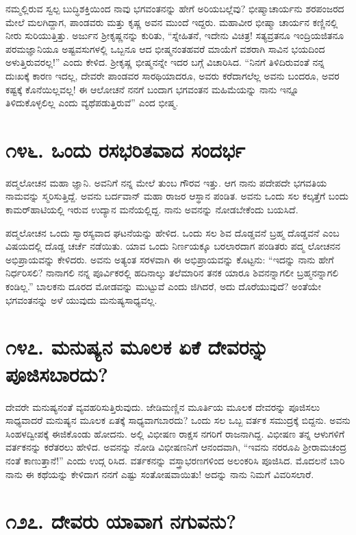ನಮ್ಮಲ್ಲಿರುವ ಸ್ವಲ್ಪ ಬುದ್ಧಿಶಕ್ತಿಯಿಂದ ನಾವು ಭಗವಂತನನ್ನು ಹೇಗೆ ಅರಿಯಬಲ್ಲೆವು? ಭೀಷ್ಮಾಚಾರ್ಯನು ಶರಪಂಜರದ ಮೇಲೆ ಮಲಗಿದ್ದಾಗ, ಪಾಂಡವರು ಮತ್ತು ಕೃಷ್ಣ ಅವನ ಮುಂದೆ ಇದ್ದರು. ಮಹಾವೀರ ಭೀಷ್ಮಾ ಚಾರ್ಯನ ಕಣ್ಣಿನಲ್ಲಿ ನೀರು ಸುರಿಯುತ್ತಿತ್ತು. ಅರ್ಜುನ ಶ್ರೀಕೃಷ್ಣನನ್ನು ಕುರಿತು, “ಸ್ನೇಹಿತನೆ, ಇದೇನು ವಿಚಿತ್ರ! ಸತ್ಯವ್ರತನೂ ಇಂದ್ರಿಯಜಿತನೂ ಪರಮಜ್ಞಾನಿಯೂ ಅಷ್ಟವಸುಗಳಲ್ಲಿ ಒಬ್ಬನೂ ಆದ ಭೀಷ್ಮನಂತಹವರೆ ಮಾಯೆಗೆ ವಶರಾಗಿ ಸಾವಿನ ಭಯದಿಂದ ಅಳುತ್ತಿರುವರಲ್ಲ!” ಎಂದು ಕೇಳಿದ. ಶ್ರೀಕೃಷ್ಣ ಭೀಷ್ಮನನ್ನೇ ಇದರ ಬಗ್ಗೆ ವಿಚಾರಿಸಿದ. “ನಿನಗೆ ತಿಳಿದಿರುವಂತೆ ನನ್ನ ದುಃಖಕ್ಕೆ ಕಾರಣ ಇದಲ್ಲ, ದೇವರೇ ಪಾಂಡವರ ಸಾರಥಿಯಾದರೂ, ಅವರು ಕರೆದಾಗಲೆಲ್ಲ ಅವನು ಬಂದರೂ, ಅವರ ಕಷ್ಟಕ್ಕೆ ಕೊನೆಯಿಲ್ಲವಲ್ಲ! ಈ ಆಲೋಚನೆ ನನಗೆ ಬಂದಾಗ ಭಗವಂತನ ಮಹಿಮೆಯನ್ನು ನಾನು ಇನ್ನೂ ತಿಳಿದುಕೊಳ್ಳಲಿಲ್ಲ ಎಂದು ವ್ಯಥೆಪಡುತ್ತಿರುವೆ” ಎಂದ ಭೀಷ್ಮ.


\section{\num{೧೪೬. } ಒಂದು ರಸಭರಿತವಾದ ಸಂದರ್ಭ}

ಪದ್ಮಲೋಚನ ಮಹಾ ಜ್ಞಾನಿ. ಅವನಿಗೆ ನನ್ನ ಮೇಲೆ ತುಂಬ ಗೌರವ ಇತ್ತು. ಆಗ ನಾನು ಪದೇಪದೇ ಭಗವತಿಯ ನಾಮವನ್ನು ಸ್ಮರಿಸುತ್ತಿದ್ದೆ. ಅವನು ಬರ್ದವಾನ್ ಮಹಾ ರಾಜರ ಆಸ್ಥಾನ ಪಂಡಿತ. ಅವನು ಒಂದು ಸಲ ಕಲ್ಕತ್ತೆಗೆ ಬಂದು ಕಾಮರ್​ಹಾಟಿಯಲ್ಲಿ ಇರುವ ಉದ್ಯಾನ ಮನೆಯಲ್ಲಿದ್ದ. ನಾನು ಅವನನ್ನು ನೋಡಬೇಕೆಂದು ಬಯಸಿದೆ.

ಪದ್ಮಲೋಚನ ಒಂದು ಸ್ವಾರಸ್ಯವಾದ ಘಟನೆಯನ್ನು ಹೇಳಿದ. ಒಂದು ಸಲ ಶಿವ ದೊಡ್ಡವನೆ ಬ್ರಹ್ಮ ದೊಡ್ಡವನೆ ಎಂಬ ವಿಷಯದಲ್ಲಿ ದೊಡ್ಡ ಚರ್ಚೆ ನಡೆಯಿತು. ಯಾವ ಒಂದು ನಿರ್ಣಯಕ್ಕೂ ಬರಲಾರದಾಗ ಪಂಡಿತರು ಪದ್ಮ ಲೋಚನನ ಅಭಿಪ್ರಾಯವನ್ನು ಕೇಳಿದರು. ಅವನು ಅತ್ಯಂತ ಸರಳವಾಗಿ ಈ ಅಭಿಪ್ರಾಯವನ್ನು ಕೊಟ್ಟನು: “ಇದನ್ನು ನಾನು ಹೇಗೆ ನಿರ್ಧರಿಸಲಿ? ನಾನಾಗಲಿ ನನ್ನ ಪೂರ್ವಿಕರಲ್ಲಿ ಹದಿನಾಲ್ಕು ತಲೆಮಾರಿನ ತನಕ ಯಾರೂ ಶಿವನನ್ನಾಗಲೀ ಬ್ರಹ್ಮನನ್ನಾಗಲಿ ಕಂಡಿಲ್ಲ.” ಬಾಲಕನು ದೂರದ ಮೋಡವನ್ನು ಮುಟ್ಟುವೆ ಎಂದು ಜಿಗಿದರೆ, ಅದು ದೊರೆಯುವುದೆ? ಅಂತೆಯೇ ಭಗವಂತನನ್ನು ಅಳೆ ಯುವುದು ಮನುಷ್ಯಸಾಧ್ಯವಲ್ಲ.


\section{\num{೧೪೭. } ಮನುಷ್ಯನ ಮೂಲಕ ಏಕೆ ದೇವರನ್ನು ಪೂಜಿಸಬಾರದು?}

ದೇವರೇ ಮನುಷ್ಯನಂತೆ ವ್ಯವಹರಿಸುತ್ತಿರುವುದು. ಜೇಡಿಮಣ್ಣಿನ ಮೂರ್ತಿಯ ಮೂಲಕ ದೇವರನ್ನು ಪೂಜಿಸಲು ಸಾಧ್ಯವಾದರೆ ಮನುಷ್ಯನ ಮೂಲಕ ಏತಕ್ಕೆ ಸಾಧ್ಯವಾಗಬಾರದು? ಒಂದು ಸಲ ಒಬ್ಬ ವರ್ತಕ ಸಮುದ್ರಕ್ಕೆ ಬಿದ್ದನು. ಅವನು ಸಿಂಹಳದ್ವೀಪಕ್ಕೆ ಈಜಿಕೊಂಡು ಹೋದನು. ಅಲ್ಲಿ ವಿಭೀಷಣ ರಾಕ್ಷಸ ನಗರಿಗೆ ರಾಜನಾಗಿದ್ದ. ವಿಭೀಷಣ ತನ್ನ ಆಳುಗಳಿಗೆ ವರ್ತಕನನ್ನು ಕರೆತರಲು ಹೇಳಿದ. ಅವನನ್ನು ನೋಡಿ ವಿಭೀಷಣನಿಗೆ ಆನಂದವಾಗಿ, “ಇವನು ನರರೂಪಿ ಶ್ರೀರಾಮಚಂದ್ರ ನಂತೆ ಕಾಣುತ್ತಾನೆ!” ಎಂದು ಉದ್ಗ ರಿಸಿದ. ವರ್ತಕನನ್ನು ವಸ್ತ್ರಾಭರಣಗಳಿಂದ ಅಲಂಕರಿಸಿ ಪೂಜಿಸಿದ. ಮೊದಲನೆ ಬಾರಿ ನಾನು ಈ ಕಥೆಯನ್ನು ಕೇಳಿದಾಗ ನನಗೆ ಎಷ್ಟು ಸಂತೋಷವಾಯಿತು! ಅದನ್ನು ನಾನು ನಿಮಗೆ ವಿವರಿಸಲಾರೆ.


\section{\num{೧೨೭. } ದೇವರು ಯಾವಾಗ ನಗುವನು?}

